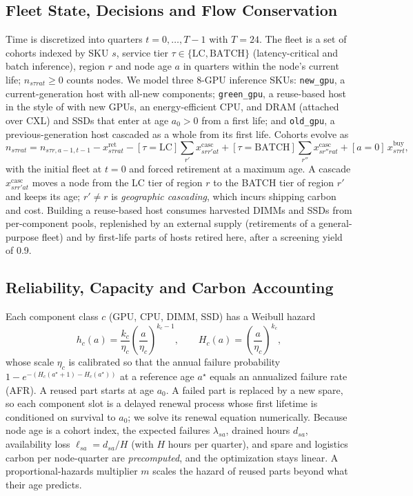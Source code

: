 \subsection{Fleet State, Decisions and Flow Conservation}
Time is discretized into quarters $t=0,\dots,T-1$ with $T=24$. The fleet is a set of cohorts indexed by SKU $s$, service tier $\tau\in\{\text{LC},\text{BATCH}\}$ (latency-critical and batch inference), region $r$ and node age $a$ in quarters within the node's current life; $n_{s\tau rat}\ge 0$ counts nodes. We model three 8-GPU inference SKUs: \texttt{new\_gpu}, a current-generation host with all-new components; \texttt{green\_gpu}, a reuse-based host in the style of \citet{wang2024greensku} with new GPUs, an energy-efficient CPU, and DRAM (attached over CXL) and SSDs that enter at age $a_0>0$ from a first life; and \texttt{old\_gpu}, a previous-generation host cascaded as a whole from its first life. Cohorts evolve as
\begin{equation}
n_{s\tau rat} = n_{s\tau r,a-1,t-1} - x^{\text{ret}}_{s\tau rat} - [\tau{=}\text{LC}]\sum_{r'} x^{\text{casc}}_{srr'at} + [\tau{=}\text{BATCH}]\sum_{r''} x^{\text{casc}}_{sr''rat} + [a{=}0]\,x^{\text{buy}}_{s\tau rt},
\label{eq:flow}
\end{equation}
with the initial fleet at $t=0$ and forced retirement at a maximum age. A cascade $x^{\text{casc}}_{srr'at}$ moves a node from the LC tier of region $r$ to the BATCH tier of region $r'$ and keeps its age; $r'\neq r$ is \emph{geographic cascading}, which incurs shipping carbon and cost. Building a reuse-based host consumes harvested DIMMs and SSDs from per-component pools, replenished by an external supply (retirements of a general-purpose fleet) and by first-life parts of hosts retired here, after a screening yield of 0.9.

\subsection{Reliability, Capacity and Carbon Accounting}
Each component class $c$ (GPU, CPU, DIMM, SSD) has a Weibull hazard
\begin{equation}
h_c(a)=\frac{k_c}{\eta_c}\left(\frac{a}{\eta_c}\right)^{k_c-1},\qquad H_c(a)=\left(\frac{a}{\eta_c}\right)^{k_c},
\label{eq:weibull}
\end{equation}
whose scale $\eta_c$ is calibrated so that the annual failure probability $1-e^{-(H_c(a^\star+1)-H_c(a^\star))}$ at a reference age $a^\star$ equals an annualized failure rate (AFR). A reused part starts at age $a_0$. A failed part is replaced by a new spare, so each component slot is a delayed renewal process whose first lifetime is conditioned on survival to $a_0$; we solve its renewal equation numerically. Because node age is a cohort index, the expected failures $\lambda_{sa}$, drained hours $d_{sa}$, availability loss $\ell_{sa}=d_{sa}/H$ (with $H$ hours per quarter), and spare and logistics carbon per node-quarter are \emph{precomputed}, and the optimization stays linear. A proportional-hazards multiplier $m$ scales the hazard of reused parts beyond what their age predicts.

